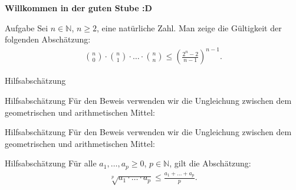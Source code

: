 \documentclass[10pt]{beamer}
\title{}
\author{Artur's Mathematikstübchen}
\date{}
\def\bN{\mathbb{N}}
\begin{document}

\begin{frame}
    \begin{center}
        \textbf{\huge Willkommen in der guten Stube \newline \newline :D}
    \end{center}
\end{frame}




\begin{frame}
    \begin{alertblock}{Aufgabe}
        Sei \( n \in \bN \), \( n \geq 2 \), eine natürliche Zahl. Man zeige die Gültigkeit der folgenden Abschätzung:
        \begin{align*}
            \binom{n}{0} \cdot \binom{n}{1} \cdot \ldots \cdot \binom{n}{n}
            \leq \left( \frac{2^{n} - 2}{n - 1} \right)^{n - 1}.
        \end{align*}
    \end{alertblock}
\end{frame}



\begin{frame}{Hilfsabschätzung}
    
\end{frame}



\begin{frame}{Hilfsabschätzung}
    Für den Beweis verwenden wir die Ungleichung zwischen dem geometrischen und arithmetischen Mittel:
\end{frame}



\begin{frame}{Hilfsabschätzung}
    Für den Beweis verwenden wir die Ungleichung zwischen dem geometrischen und arithmetischen Mittel:
    \begin{block}{Hilfsabschätzung}
        Für alle \( a_{1}, \ldots, a_{p} \geq 0 \), \( p \in \bN \), gilt die Abschätzung:
        \begin{align*}
            \sqrt[p]{a_{1} \cdot \ldots \cdot a_{p}} 
            \leq \frac{a_{1} + \ldots + a_{p}}{p}.
        \end{align*}
    \end{block}
\end{frame}
\end{document}
